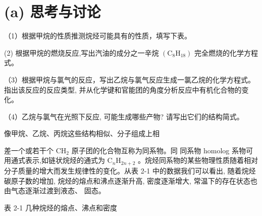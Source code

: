 \documentclass[10pt]{article}
\begin{document}
\section*{(a) 思考与讨论}

（1）根据甲烷的性质推测烷烃可能具有的性质，填写下表。

\begin{center}
\end{center}

(2) 根据甲烷的燃烧反应,写出汽油的成分之一辛烷 \(\left( {{\mathrm{C}}_{8}{\mathrm{H}}_{18}}\right)\) 完全燃烧的化学方程式。

（3）根据甲烷与氯气的反应，写出乙烷与氯气反应生成一氯乙烷的化学方程式。 指出该反应的反应类型, 并从化学键和官能团的角度分析反应中有机化合物的变化。

（4）乙烷与氯气在光照下反应, 可能生成哪些产物? 请写出它们的结构简式。

像甲烷、乙烷、丙烷这些结构相似、分子组成上相

差一个或若干个 \({\mathrm{{CH}}}_{2}\) 原子团的化合物互称为同系物。同 同系物 homolog 系物可用通式表示,如链状烷烃的通式为 \({\mathrm{C}}_{n}{\mathrm{H}}_{{2n} + 2}\) 。烷烃同系物的某些物理性质随着相对分子质量的增大而发生规律性的变化。从表 2-1 中的数据我们可以看出, 随着烷烃碳原子数的增加, 烷烃的熔点和沸点逐渐升高, 密度逐渐增大, 常温下的存在状态也由气态逐渐过渡到液态、 固态。

表 2-1 几种烷烃的熔点、沸点和密度
\end{document}

